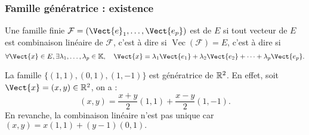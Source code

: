 \documentclass{book}
\begin{document}
\subsubsection{Famille génératrice : existence}
\begin{Definition} Une famille finie  $\mathcal{F}=(\Vect{e}_1,\dots,\Vect{e_p})$ est  de $E$ si tout vecteur de $E$ est combinaison linéaire de $\mathcal{F}$, c'est à dire si $\operatorname{Vec} (\mathcal{F}) = E$, c'est à dire si 
\[ \forall \Vect{x} \in E,\exists \lambda_1,\dots,\lambda_p \in \K,\quad \Vect{x} = \lambda_1 \Vect{e_1}+ \lambda_2 \Vect{e_2}+\dots +\lambda_p \Vect{e_p}. \]
\end{Definition}
\begin{Exemple} La famille  $\{(1,1), (0,1), (1,-1)\}$  est génératrice de $\mathbb{R}^2$. En effet, soit $\Vect{x}=(x,y)\in\R^2$, on a :
$$(x,y)=\frac{x+y}{2}(1,1)+ \frac{x-y}{2} (1,-1).$$
En revanche,  la combinaison linéaire n'est pas unique car $(x,y)= x(1,1)+(y-1)(0,1).$
\end{Exemple}
\end{document}
